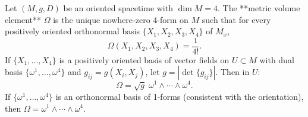 Let $(M, g, D)$ be an oriented spacetime with $\dim M = 4$. The **metric volume element** $\Omega$ is the unique nowhere-zero 4-form on $M$ such that for every positively oriented orthonormal basis $\{X_1, X_2, X_3, X_4\}$ of $M_x$,
$$\Omega(X_1, X_2, X_3, X_4) = \frac{1}{4!}.$$
If $\{X_1, \ldots, X_4\}$ is a positively oriented basis of vector fields on $U \subset M$ with dual basis $\{\omega^1, \ldots, \omega^4\}$ and $g_{ij} = g(X_i, X_j)$, let $g = |\det\{g_{ij}\}|$. Then in $U$:
$$\Omega = \sqrt{g}\; \omega^1 \wedge \cdots \wedge \omega^4.$$
If $\{\omega^1, \ldots, \omega^4\}$ is an orthonormal basis of 1-forms (consistent with the orientation), then $\Omega = \omega^1 \wedge \cdots \wedge \omega^4$.
